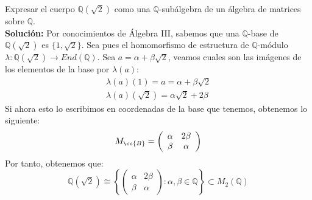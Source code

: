 \begin{ejercicio}
    Expresar el cuerpo $\mathbb{Q}(\sqrt{2})$ como una $\mathbb{Q}$-subálgebra de un álgebra de matrices sobre $\mathbb{Q}$. \\
    
    \noindent
    \textbf{Solución:}
    Por conocimientos de Álgebra III, sabemos que una $\mathbb{Q}$-base de $\mathbb{Q}(\sqrt{2})$ es $\{1, \sqrt{2}\}$. Sea pues el homomorfismo de estructura de $\mathbb{Q}$-módulo $\lambda: \mathbb{Q}(\sqrt{2}) \to End(\mathbb{Q})$. Sea $a = \alpha + \beta \sqrt{2}$, veamos cuales son las imágenes de los elementos de la base por $\lambda(a)$:
    \begin{gather*}
        \lambda(a)(1) = a = \alpha + \beta \sqrt{2} \\
        \lambda(a)(\sqrt{2}) = \alpha\sqrt{2} + 2\beta 
    \end{gather*}
    Si ahora esto lo escribimos en coordenadas de la base que tenemos, obtenemos lo siguiente:
    \begin{equation*}
        M_{\cc{B}} = \left(\begin{array}{cc}
            \alpha & 2\beta \\
            \beta & \alpha 
        \end{array}\right)
    \end{equation*}
    Por tanto, obtenemos que:
    \begin{equation*}
        \mathbb{Q}(\sqrt{2}) \cong \left\{\left(\begin{array}{cc}
            \alpha & 2\beta \\
            \beta & \alpha 
        \end{array}\right) : \alpha, \beta \in \mathbb{Q}\right\} \subset M_2(\mathbb{Q})
    \end{equation*}
\end{ejercicio}

